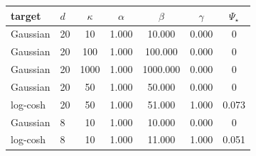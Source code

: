 \begin{tabular}{llccccc}
\toprule
target & $d$ & $\kappa$ & $\alpha$ & $\beta$ & $\gamma$ & $\Psi_\star$ \\
\midrule
Gaussian & 20 & 10 & 1.000 & 10.000 & 0.000 & 0 \\
Gaussian & 20 & 100 & 1.000 & 100.000 & 0.000 & 0 \\
Gaussian & 20 & 1000 & 1.000 & 1000.000 & 0.000 & 0 \\
Gaussian & 20 & 50 & 1.000 & 50.000 & 0.000 & 0 \\
log-cosh & 20 & 50 & 1.000 & 51.000 & 1.000 & 0.073 \\
Gaussian & 8 & 10 & 1.000 & 10.000 & 0.000 & 0 \\
log-cosh & 8 & 10 & 1.000 & 11.000 & 1.000 & 0.051 \\
\bottomrule
\end{tabular}
